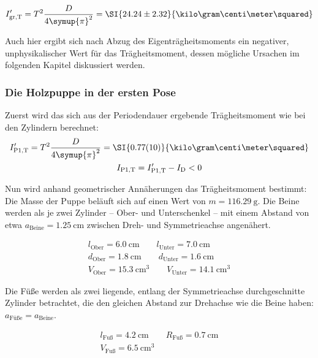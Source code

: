 \begin{gather}
    I'_\text{gr,T}=T^2\frac{D}{4\symup{\pi}^2}=\SI{24.24\pm2.32}{\kilo\gram\centi\meter\squared} 
\end{gather}

Auch hier ergibt sich nach Abzug des Eigenträgheitsmoments ein negativer, unphysikalischer Wert für das Trägheitsmoment, 
dessen mögliche Ursachen im folgenden Kapitel diskussiert werden. 

\FloatBarrier
\subsubsection{Die Holzpuppe in der ersten Pose}

Zuerst wird das sich aus der Periodendauer ergebende Trägheitsmoment wie bei den Zylindern berechnet: 
\begin{gather}
    I'_\text{P1,T}=T^2\frac{D}{4\symup{\pi}^2}=\SI{0.77(10)}{\kilo\gram\centi\meter\squared} \\
    I_\text{P1,T}=I'_\text{P1,T}-I_\text{D} <0 
\end{gather}

Nun wird anhand geometrischer Annäherungen das Trägheitsmoment bestimmt:
Die Masse der Puppe beläuft sich auf einen Wert von ${m=\SI{116.29}{\gram}}$. 
Die Beine werden als je zwei Zylinder -- Ober- und Unterschenkel -- mit einem Abstand von etwa 
${a_\text{Beine}=\SI{1.25}{\centi\meter}}$ zwischen Dreh- und Symmetrieachse angenähert.  

\begin{gather}
    l_\text{Ober}=\SI{6.0}{\centi\meter} \quad \quad
    l_\text{Unter}=\SI{7.0}{\centi\meter} \\
    d_\text{Ober}=\SI{1.8}{\centi\meter} \quad \quad     
    d_\text{Unter}=\SI{1.6}{\centi\meter} \\ 
    V_\text{Ober}=\SI{15.3}{\centi\meter\tothe{3}} \quad \quad
    V_\text{Unter}=\SI{14.1}{\centi\meter\tothe{3}} 
\end{gather}

Die Füße werden als zwei liegende, entlang der Symmetrieachse durchgeschnitte Zylinder betrachtet, die den gleichen 
Abstand zur Drehachse wie die Beine haben: ${a_\text{Füße}=a_\text{Beine}}$. 

\begin{gather}
    l_\text{Fuß}=\SI{4.2}{\centi\meter} \quad \quad 
    R_\text{Fuß}=\SI{0.7}{\centi\meter} \\
    V_\text{Fuß}=\SI{6.5}{\centi\meter\tothe{3}}
\end{gather}

